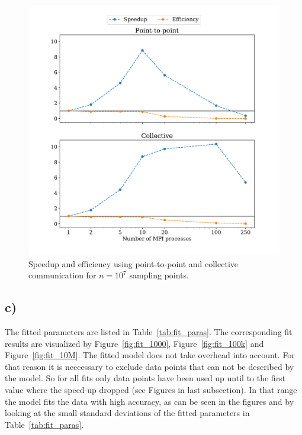 \documentclass[a4paper, 11pt]{article}
\begin{document}
\begin{figure}
  \centering
  \includegraphics[width=\textwidth]{../trapezoid/plot/10000000.pdf}
  \caption{Speedup and efficiency using point-to-point and collective communication for $n=10^{7}$ sampling points.}
  \label{fig:1_n_10M}
\end{figure}

\FloatBarrier
\subsection*{c)}
The fitted parameters are listed in Table~\ref{tab:fit_paras}. The
corresponding fit results are visualized by Figure~\ref{fig:fit_1000},
Figure~\ref{fig:fit_100k} and Figure~\ref{fig:fit_10M}. The fitted model does
not take overhead into account. For that reason it is neccessary to exclude
data points that can not be described by the model. So for all fits only data
points have been used up until to the first value where the speed-up dropped
(see Figures in last subsection). In that range the model fits the data with
high accuracy, as can be seen in the figures and by looking at the small
standard deviations of the fitted parameters in Table~\ref{tab:fit_paras}.
 
\end{document}
